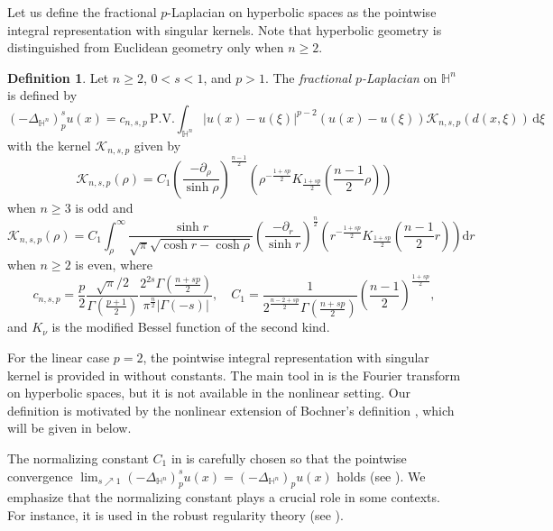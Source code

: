 \documentclass[11pt]{amsart}
\theoremstyle{plain}
\theoremstyle{definition}
\newtheorem{definition}[theorem]{Definition}
\numberwithin{equation}{section}
\begin{document}
Let us define the fractional $p$-Laplacian on hyperbolic spaces as the pointwise integral representation with singular kernels. Note that hyperbolic geometry is distinguished from Euclidean geometry only when $n \geq 2$.

\begin{definition} \label{def:kernel}
Let $n \geq 2$, $0<s<1$, and $p > 1$. The \emph{fractional $p$-Laplacian} on $\mathbb{H}^{n}$ is defined by
\begin{equation} \label{eq:pw-representation}
(-\Delta_{\mathbb{H}^{n}})^{s}_{p} u(x) = c_{n, s, p} \, \mathrm{P.V.} \int_{\mathbb{H}^{n}} |u(x)-u(\xi)|^{p-2} (u(x)-u(\xi)) \mathcal{K}_{n,s,p}(d(x,\xi)) \,\mathrm{d}\xi
\end{equation}
with the kernel $\mathcal{K}_{n,s,p}$ given by
\begin{equation*}
\mathcal{K}_{n,s,p}(\rho) = C_{1} \left( \frac{-\partial_\rho}{\sinh \rho} \right)^{\frac{n-1}{2}} \left( \rho^{-\frac{1+sp}{2}} K_{\frac{1+sp}{2}} \left(\frac{n-1}{2}\rho \right) \right)
\end{equation*}
when $n \geq 3$ is odd and
\begin{equation*}
\mathcal{K}_{n,s,p}(\rho) = C_{1} \int_{\rho}^{\infty} \frac{\sinh r}{\sqrt{\pi}\sqrt{\cosh r - \cosh \rho}} \left( \frac{-\partial_r}{\sinh r} \right)^{\frac{n}{2}} \left( r^{-\frac{1+sp}{2}} K_{\frac{1+sp}{2}}\left( \frac{n-1}{2}r \right) \right) \mathrm{d}r
\end{equation*}
when $n \geq 2$ is even, where
\begin{equation}\label{eq-cnsp}
c_{n, s, p} = \frac{p}{2} \frac{\sqrt{\pi}/2}{\Gamma(\frac{p+1}{2})} \frac{2^{2s} \Gamma(\frac{n+sp}{2})}{\pi^{\frac{n}{2}} |\Gamma(-s)|}, \quad C_{1} = \frac{1}{2^{\frac{n-2+sp}{2}} \Gamma(\frac{n+sp}{2})} \left( \frac{n-1}{2} \right)^{\frac{1+sp}{2}},
\end{equation}
and $K_{\nu}$ is the modified Bessel function of the second kind.
\end{definition}

For the linear case $p=2$, the pointwise integral representation with singular kernel is provided in \cite[Theorem 2.4 and 2.5]{BGS15} without constants. The main tool in \cite{BGS15} is the Fourier transform on hyperbolic spaces, but it is not available in the nonlinear setting. Our definition is motivated by the nonlinear extension of Bochner's definition \cite{Boc49}, which will be given in  below.

The normalizing constant $C_{1}$ in  is carefully chosen so that the pointwise convergence $\lim_{s \nearrow 1} (-\Delta_{\mathbb{H}^{n}})^{s}_{p} u(x) = (-\Delta_{\mathbb{H}^{n}})_{p} u(x)$ holds (see ). We emphasize that the normalizing constant plays a crucial role in some contexts. For instance, it is used in the robust regularity theory (see \cite{CS09,KKL21}).
\end{document}

